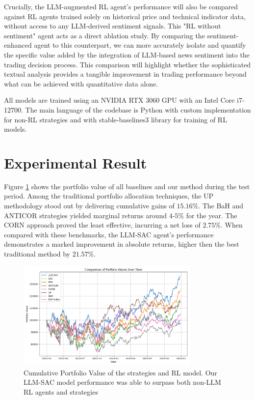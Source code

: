 Crucially, the \gls{LLM}-augmented \gls{RL} agent's performance will also be compared against RL agents trained solely on historical price and technical indicator data, without access to any \gls{LLM}-derived sentiment signals. This "RL without sentiment" agent acts as a direct ablation study. By comparing the sentiment-enhanced agent to this counterpart, we can more accurately isolate and quantify the specific value added by the integration of \gls{LLM}-based news sentiment into the trading decision process. This comparison will highlight whether the sophisticated textual analysis provides a tangible improvement in trading performance beyond what can be achieved with quantitative data alone.

All models are trained using an NVIDIA RTX 3060 GPU with an Intel Core i7-12700. The main language of the codebase is Python with custom implementation for non-\gls{RL} strategies and with stable-baselines3 library for training of \gls{RL} models.

\section{Experimental Result}
Figure \ref{fig:portfolio_value} shows the portfolio value of all baselines and our method during the test period. Among the traditional portfolio allocation techniques, the \gls{UP} methodology stood out by delivering cumulative gains of \(15.16\%\). The \gls{BaH} and \gls{ANTICOR} strategies yielded marginal returns around \(4\)-\(5\%\) for the year. The CORN approach proved the least effective, incurring a net loss of \(2.75\%\). When compared with these benchmarks, the LLM‑SAC agent’s performance demonstrates a marked improvement in absolute returns, higher then the best traditional method by \(21.57\%\).

\begin{figure}
  \centering
  \includegraphics[width=0.8\textwidth]{images/CPV_plot.png}
  \caption{Cumulative Portfolio Value of the strategies and RL model. Our LLM-SAC model performance was able to surpass both non-LLM RL agents and strategies}
  \label{fig:portfolio_value}
\end{figure}

